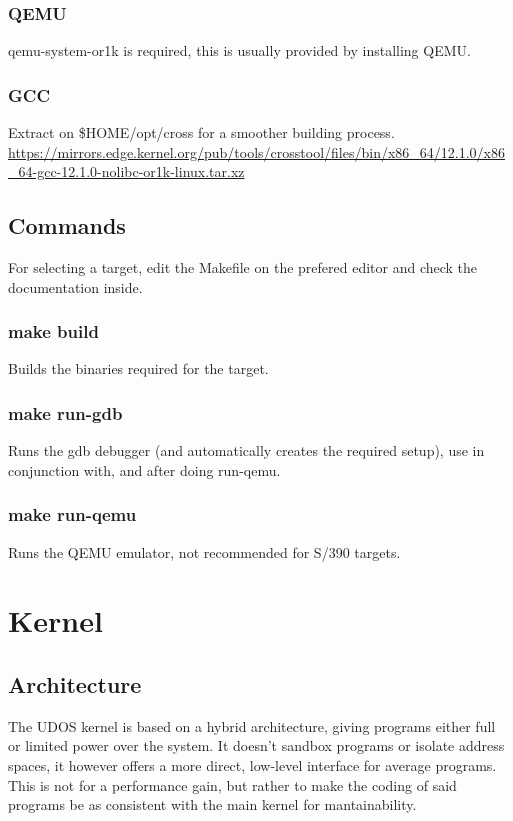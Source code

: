 \documentclass{article}
\begin{document}
\subsubsection{QEMU}
qemu-system-or1k is required, this is usually provided by installing QEMU.

\subsubsection{GCC}
Extract on \$HOME/opt/cross for a smoother building process.
\url{https://mirrors.edge.kernel.org/pub/tools/crosstool/files/bin/x86_64/12.1.0/x86_64-gcc-12.1.0-nolibc-or1k-linux.tar.xz}

\subsection{Commands}
For selecting a target, edit the Makefile on the prefered editor and check the documentation inside.

\subsubsection{make build}
Builds the binaries required for the target.

\subsubsection{make run-gdb}
Runs the gdb debugger (and automatically creates the required setup), use in conjunction with, and after doing run-qemu.

\subsubsection{make run-qemu}
Runs the QEMU emulator, not recommended for S/390 targets.

\section{Kernel}

\subsection{Architecture}
The UDOS kernel is based on a hybrid architecture, giving programs either full or limited power over the system. It doesn't sandbox programs or isolate address spaces, it however offers a more direct, low-level interface for average programs. This is not for a performance gain, but rather to make the coding of said programs be as consistent with the main kernel for mantainability.
\end{document}
